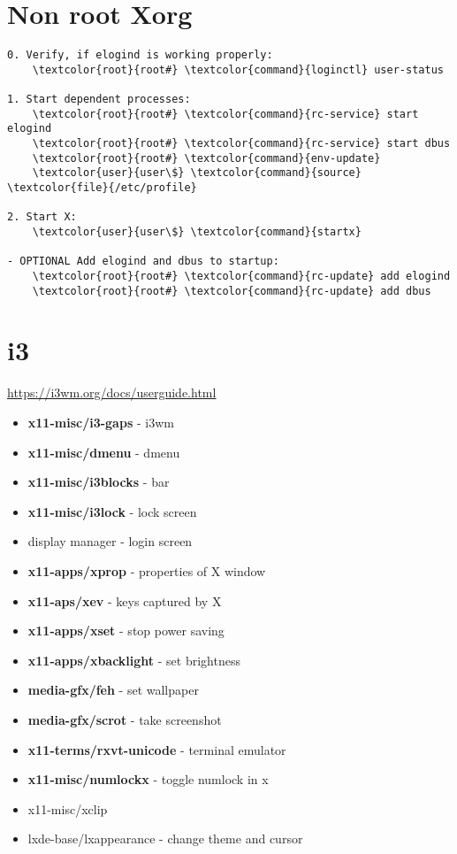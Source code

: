 \documentclass[10pt, a4paper, onecolumn, openany]{book}         %
\begin{document}
\section{Non root Xorg}
\begin{Verbatim}[commandchars=\\\{\}]
0. Verify, if elogind is working properly:
    \textcolor{root}{root#} \textcolor{command}{loginctl} user-status

1. Start dependent processes:
    \textcolor{root}{root#} \textcolor{command}{rc-service} start elogind
    \textcolor{root}{root#} \textcolor{command}{rc-service} start dbus
    \textcolor{root}{root#} \textcolor{command}{env-update}
    \textcolor{user}{user\$} \textcolor{command}{source} \textcolor{file}{/etc/profile}

2. Start X:
    \textcolor{user}{user\$} \textcolor{command}{startx}

- OPTIONAL Add elogind and dbus to startup:
    \textcolor{root}{root#} \textcolor{command}{rc-update} add elogind
    \textcolor{root}{root#} \textcolor{command}{rc-update} add dbus
\end{Verbatim}


\newpage
\section{i3}
\underline{\url{https://i3wm.org/docs/userguide.html}}\newline
\begin{itemize}
    \item \textbf{x11-misc/i3-gaps}     - i3wm
    \item \textbf{x11-misc/dmenu}       - dmenu
    \item \textbf{x11-misc/i3blocks}    - bar
    \item \textbf{x11-misc/i3lock}      - lock screen
    \item display manager - login screen
    \item \textbf{x11-apps/xprop}       - properties of X window
    \item \textbf{x11-aps/xev}          - keys captured by X
    \item \textbf{x11-apps/xset}        - stop power saving
    \item \textbf{x11-apps/xbacklight}  - set brightness
    \item \textbf{media-gfx/feh}        - set wallpaper
    \item \textbf{media-gfx/scrot}      - take screenshot
    \item \textbf{x11-terms/rxvt-unicode} - terminal emulator
    \item \textbf{x11-misc/numlockx} - toggle numlock in x
    \item x11-misc/xclip
    \item lxde-base/lxappearance - change theme and cursor
\end{itemize}
\end{document}
